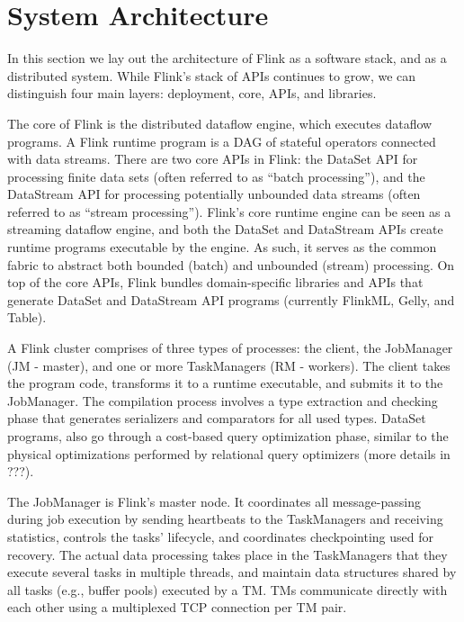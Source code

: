 
\section{System Architecture}

In this section we lay out the architecture of Flink as a software stack, and as a distributed system. While Flink's stack of APIs continues to grow, we can distinguish four main layers: deployment, core, APIs, and libraries.

 The core of Flink is the distributed dataflow engine, which executes dataflow programs. A Flink runtime program is a DAG of stateful operators connected with data streams. There are two core APIs in Flink: the DataSet API for processing finite data sets (often referred to as “batch processing”), and the DataStream API for processing potentially unbounded data streams (often referred to as “stream processing”). Flink’s core runtime engine can be seen as a streaming dataflow engine, and both the DataSet and DataStream APIs create runtime programs executable by the engine. As such, it serves as the common fabric to abstract both bounded (batch) and unbounded (stream) processing. On top of the core APIs, Flink bundles domain-specific libraries and APIs that generate DataSet and DataStream API programs (currently FlinkML, Gelly, and Table). 

A Flink cluster comprises of three types of processes: the client, the JobManager (JM - master), and one or more TaskManagers (RM - workers). The client takes the program code, transforms it to a runtime executable, and submits it to the JobManager. The compilation process involves a type extraction and checking phase that generates serializers and comparators for all used types. DataSet programs, also go through a cost-based query optimization phase, similar to the physical optimizations performed by relational query optimizers (more details in ???).

The JobManager is Flink’s master node. It coordinates all message-passing during job execution by sending heartbeats to the TaskManagers and receiving statistics, controls the tasks’ lifecycle, and coordinates checkpointing used for recovery. The actual data processing takes place in the TaskManagers that they execute several tasks in multiple threads, and maintain data structures shared by all tasks (e.g., buffer pools) executed by a TM. TMs communicate directly with each other using a multiplexed TCP connection per TM pair. 

